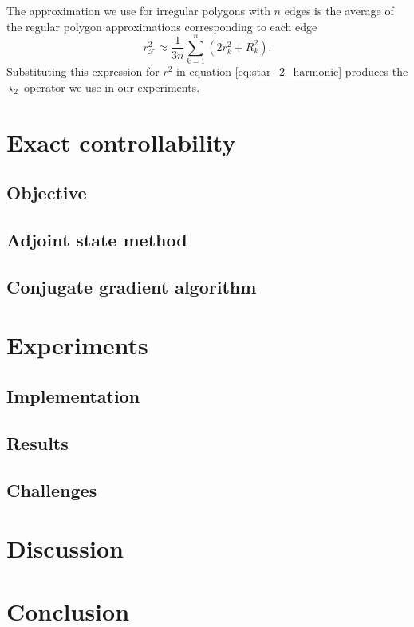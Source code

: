 \documentclass[utf8,english]{gradu3}
\begin{document}
The approximation we use for irregular polygons with $n$ edges is the average
of the regular polygon approximations corresponding to each edge
\begin{equation}\label{eq:polygon_approx_radius}
  r^2_{\mathcal{F}} \approx \frac{1}{3n} \sum_{k=1}^n (2r_k^2 + R_k^2).
\end{equation}
Substituting this expression for $r^2$ in equation \eqref{eq:star_2_harmonic}
produces the $\star_2$ operator we use in our experiments.


\chapter{Exact controllability}


\section{Objective}

\section{Adjoint state method}

\section{Conjugate gradient algorithm}



\chapter{Experiments}\label{cha:experiments}

\section{Implementation}

\section{Results}

\section{Challenges}




\chapter{Discussion}



\chapter{Conclusion}



\hfuzz=3.5pt
\printbibliography
\hfuzz=0pt
\end{document}
